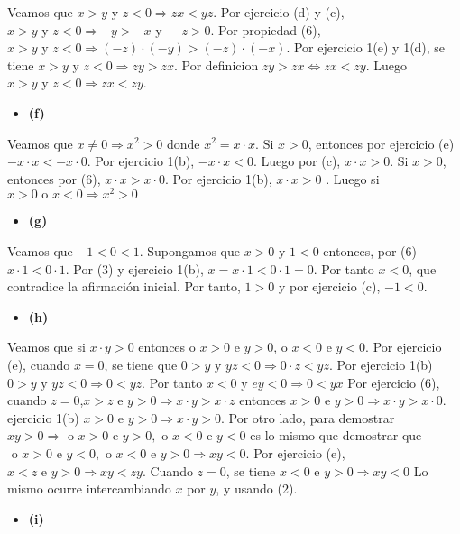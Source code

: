 \documentclass{article}
\begin{document}
Veamos que \(x>y\text{ y }z<0 \Longrightarrow zx<yz\). Por ejercicio (d) y (c), \(x>y \text{ y }z<0\Longrightarrow -y>-x\text{ y }-z>0\). Por propiedad (6), \(x>y \text{ y }z<0 \Longrightarrow \left(-z\right)\cdot\left(-y\right)>\left(-z\right)\cdot\left(-x\right)\). Por ejercicio 1(e) y 1(d), se tiene \(x>y \text{ y }z<0 \Longrightarrow zy>zx\). Por definicion \(zy>zx\Longleftrightarrow zx<zy\). Luego \(x>y \text{ y }z<0 \Longrightarrow zx<zy\).
\begin{itemize}
\item \bf (f) \rm 
\end{itemize}
Veamos que \(x\neq 0 \Rightarrow x^2>0\) donde \(x^2=x\cdot x\). Si \(x>0\), entonces por ejercicio (e) \(-x \cdot x<-x\cdot 0\). Por ejercicio 1(b),  \(-x \cdot x<0\). Luego por (c), \(x\cdot x >0\). Si \(x>0\), entonces por (6), \(x\cdot x>x \cdot 0\). Por ejercicio 1(b), \(x\cdot x>0\) . Luego si \(x>0 \text{ o } x<0\Rightarrow x^2>0\)
\begin{itemize}
\item \bf (g) \rm 
\end{itemize}
Veamos que \(-1<0<1\). Supongamos que \(x>0 \text{ y }1<0\) entonces, por (6) \(x\cdot 1 <0\cdot 1\). Por (3) y ejercicio 1(b), \(x=x\cdot 1 <0\cdot 1=0\). Por tanto \(x<0\), que contradice la afirmación inicial. Por tanto, \(1>0\) y por ejercicio (c), \(-1<0\).
\begin{itemize}
\item \bf (h) \rm 
\end{itemize}
Veamos que si \(x\cdot y>0\) entonces o \(x>0 \text{ e } y>0\), o \(x<0 \text{ e } y<0\).  
Por ejercicio (e), cuando \(x=0\), se tiene que \(0>y\text{ y } y z<0\Rightarrow 0\cdot z<yz\). Por ejercicio 1(b) \(0>y\text{ y } y z<0\Rightarrow 0<yz\). Por tanto \(x<0\text{ y } e y<0\Rightarrow 0<yx\)  Por ejercicio (6), cuando \(z=0\),\(x>z\text{ e }y>0\Rightarrow x\cdot y > x\cdot z\) entonces \(x>0\text{ e }y>0\Rightarrow x\cdot y > x\cdot 0\). ejercicio 1(b) \(x>0\text{ e }y>0\Rightarrow x\cdot y > 0\). Por otro lado, para demostrar \(xy>0\Rightarrow \text{ o } x>0 \text{ e } y>0, \text{ o } x<0 \text{ e } y<0 \) es lo mismo que demostrar que \( \text{ o } x>0 \text{ e } y<0, \text{ o } x<0 \text{ e } y>0 \Rightarrow xy<0\). Por ejercicio (e),  \(x<z\text{ e } y>0 \Rightarrow xy<zy\). Cuando \(z=0\), se tiene  \(x<0\text{ e } y>0 \Rightarrow xy<0\) Lo mismo ocurre intercambiando \(x\) por \(y\), y usando (2).
\begin{itemize}
\item \bf (i) \rm 
\end{itemize}
\end{document}
